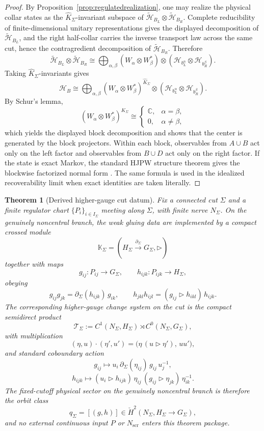\documentclass[11pt]{article}
\newtheorem{theorem}{Theorem}[section]
\begin{document}
\begin{proof}
By Proposition~\ref{prop:regulatedrealization}, one may realize the physical collar states as the \(\widehat K_\Sigma\)-invariant subspace of \(\tilde{\mathcal H}_{B_L}\otimes \tilde{\mathcal H}_{B_R}\). Complete reducibility of finite-dimensional unitary representations gives the displayed decomposition of \(\tilde{\mathcal H}_{B_L}\), and the right half-collar carries the inverse transport law across the same cut, hence the contragredient decomposition of \(\tilde{\mathcal H}_{B_R}\). Therefore
\[
\tilde{\mathcal H}_{B_L}\otimes \tilde{\mathcal H}_{B_R}
\cong
\bigoplus_{\alpha,\beta}
(W_\alpha\otimes W_\beta^*)\otimes
(\mathcal H_{b_L^\alpha}\otimes \mathcal H_{b_R^\beta}).
\]
Taking \(\widehat K_\Sigma\)-invariants gives
\[
\mathcal H_B
\cong
\bigoplus_{\alpha,\beta}
(W_\alpha\otimes W_\beta^*)^{\widehat K_\Sigma}\otimes
(\mathcal H_{b_L^\alpha}\otimes \mathcal H_{b_R^\beta}).
\]
By Schur's lemma,
\[
(W_\alpha\otimes W_\beta^*)^{\widehat K_\Sigma}
\cong
\begin{cases}
\mathbb C, & \alpha=\beta,\\
0, & \alpha\neq \beta,
\end{cases}
\]
which yields the displayed block decomposition and shows that the center is generated by the block projectors. Within each block, observables from \(A\cup B\) act only on the left factor and observables from \(B\cup D\) act only on the right factor. If the state is exact Markov, the standard HJPW structure theorem gives the blockwise factorized normal form \cite{hjpw04}. The same formula is used in the idealized recoverability limit when exact identities are taken literally.
\end{proof}

\begin{theorem}[Derived higher-gauge cut datum]\label{thm:hgdatum}
Fix a connected cut \(\Sigma\) and a finite regulator chart \(\{P_i\}_{i\in I_\Sigma}\) meeting along \(\Sigma\), with finite nerve \(N_\Sigma\). On the genuinely noncentral branch, the weak gluing data are implemented by a compact crossed module
\[
\mathbb K_\Sigma=(H_\Sigma\xrightarrow{\partial_\Sigma}G_\Sigma,\triangleright)
\]
together with maps
\[
g_{ij}:P_{ij}\to G_\Sigma,
\qquad
h_{ijk}:P_{ijk}\to H_\Sigma,
\]
obeying
\[
g_{ij}g_{jk}=\partial_\Sigma(h_{ijk})\,g_{ik},
\qquad
h_{jkl}h_{ijl}=(g_{ij}\triangleright h_{ikl})\,h_{ijk}.
\]
The corresponding higher-gauge change system on the cut is the compact semidirect product
\[
\mathcal T_\Sigma:=C^1(N_\Sigma,H_\Sigma)\rtimes C^0(N_\Sigma,G_\Sigma),
\]
with multiplication
\[
(\eta,u)\cdot(\eta',u')
=
\bigl(\eta\,(u\triangleright \eta'),\,uu'\bigr),
\]
and standard coboundary action
\[
g_{ij}\mapsto u_i\,\partial_\Sigma(\eta_{ij})\,g_{ij}\,u_j^{-1},
\]
\[
h_{ijk}\mapsto
(u_i\triangleright h_{ijk})\,
\eta_{ij}\,
(g_{ij}\triangleright \eta_{jk})\,
\eta_{ik}^{-1}.
\]
The fixed-cutoff physical sector on the genuinely noncentral branch is therefore the orbit class
\[
q_\Sigma=[(g,h)]\in \check H^2(N_\Sigma,H_\Sigma\to G_\Sigma),
\]
and no external continuous input \(P\) or \(N_{\mathrm{scr}}\) enters this theorem package.
\end{theorem}
\end{document}
